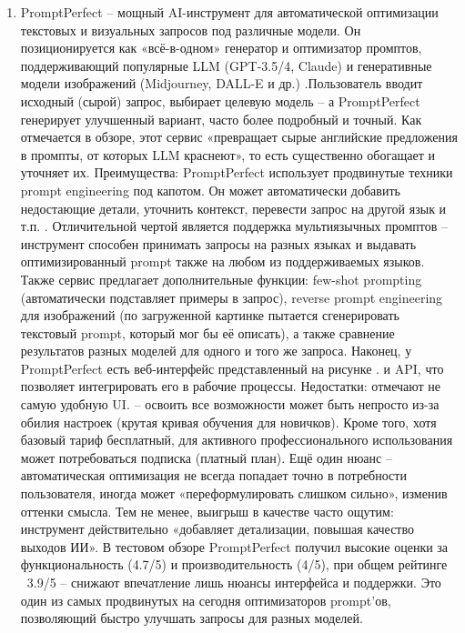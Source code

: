 \begin{enumerate}[label=\arabic*]
\begin{figure}[htbp]
\end{figure}
\item  PromptPerfect – мощный AI-инструмент для автоматической оптимизации текстовых и визуальных запросов под различные модели. Он позиционируется как «всё-в-одном» генератор и оптимизатор промптов, поддерживающий популярные LLM (GPT-3.5/4, Claude) и генеративные модели изображений (Midjourney, DALL-E и др.) \cite{dhruvirzala:promptperfect}.Пользователь вводит исходный (сырой) запрос, выбирает целевую модель – а PromptPerfect генерирует улучшенный вариант, часто более подробный и точный. Как отмечается в обзоре, этот сервис «превращает сырые английские предложения в промпты, от которых LLM краснеют», то есть существенно обогащает и уточняет их.  Преимущества: PromptPerfect использует продвинутые техники prompt engineering под капотом. Он может автоматически добавить недостающие детали, уточнить контекст, перевести запрос на другой язык и т.п. \cite{dhruvirzala:promptperfect}. Отличительной чертой является поддержка мультиязычных промптов – инструмент способен принимать запросы на разных языках и выдавать оптимизированный prompt также на любом из поддерживаемых языков. Также сервис предлагает дополнительные функции: few-shot prompting (автоматически подставляет примеры в запрос), reverse prompt engineering для изображений (по загруженной картинке пытается сгенерировать текстовый prompt, который мог бы её описать), а также сравнение результатов разных моделей для одного и того же запроса. Наконец, у PromptPerfect есть веб-интерфейс представленный на рисунке \cite{dhruvirzala:promptperfect}. и API, что позволяет интегрировать его в рабочие процессы. Недостатки: отмечают не самую удобную UI\cite{dhruvirzala:promptperfect}. – освоить все возможности может быть непросто из-за обилия настроек (крутая кривая обучения для новичков). Кроме того, хотя базовый тариф бесплатный, для активного профессионального использования может потребоваться подписка (платный план). Ещё один нюанс – автоматическая оптимизация не всегда попадает точно в потребности пользователя, иногда может «переформулировать слишком сильно», изменив оттенки смысла. Тем не менее, выигрыш в качестве часто ощутим: инструмент действительно «добавляет детализации, повышая качество выходов ИИ»\cite{dhruvirzala:promptperfect}. В тестовом обзоре PromptPerfect получил высокие оценки за функциональность (4.7/5) и производительность (4/5), при общем рейтинге ~3.9/5 – снижают впечатление лишь нюансы интерфейса и поддержки. Это один из самых продвинутых на сегодня оптимизаторов prompt’ов, позволяющий быстро улучшать запросы для разных моделей. 

\end{enumerate}
